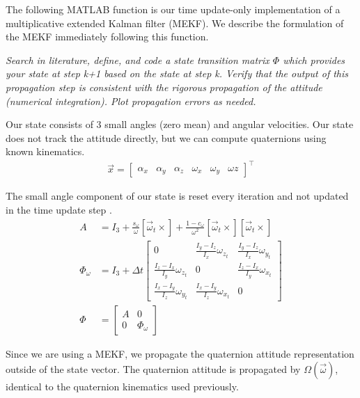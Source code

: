 The following MATLAB function is our time update-only implementation of a multiplicative extended Kalman filter (MEKF). We describe the formulation of the MEKF immediately following this function.



\textit{Search in literature, define, and code a state transition matrix $\Phi$ which provides your state at step k+1 based on the state at step k. Verify that the output of this propagation step is consistent with the rigorous propagation of the attitude (numerical integration). Plot propagation errors as needed.}

Our state consists of 3 small angles (zero mean) and angular velocities. Our state does not track the attitude directly, but we can compute quaternions using known kinematics.
\begin{align*}
    \Vec{x} = \begin{bmatrix}
        \alpha_{x} & \alpha_{y} & \alpha_{z} & \omega_{x} & \omega_{y} & \omega{z}
    \end{bmatrix}^{\intercal}
\end{align*}

The small angle component of our state is reset every iteration and not updated in the time update step \cite{CubeSatTelescope}.
\begin{align*}
    A &= I_{3} + \frac{s_{\omega}}{\omega} [\Vec{\omega}_{t} \times] + \frac{1 - c_{\omega}}{\omega^{2}} [\Vec{\omega}_{t} \times] [\Vec{\omega}_{t} \times] \\
    \Phi_{\omega} & = I_{3} + \Delta t \begin{bmatrix}
        0 & \frac{I_{y} - I_{z}}{I_x} \omega_{z_{t}} & \frac{I_{y} - I_{z}}{I_x} \omega_{y_{t}} \\
        \frac{I_{z} - I_{x}}{I_y} \omega_{z_{t}} & 0 & \frac{I_{z} - I_{x}}{I_y} \omega_{x_{t}} \\
        \frac{I_{x} - I_{y}}{I_z} \omega_{y_{t}} & \frac{I_{x} - I_{y}}{I_z} \omega_{x_{t}} & 0
    \end{bmatrix} \\
    \Phi &= \begin{bmatrix}
        A & 0 \\
        0 & \Phi_{\omega}
    \end{bmatrix}
\end{align*}

Since we are using a MEKF, we propagate the quaternion attitude representation outside of the state vector. The quaternion attitude is propagated by $\Omega (\Vec{\omega})$, identical to the quaternion kinematics used previously.

